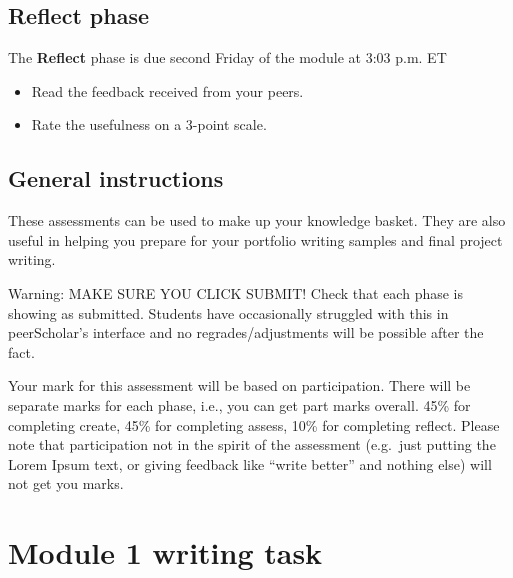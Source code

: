 \documentclass[
  openany]{book}
\begin{document}
\hypertarget{reflect-phase}{%
\subsection{Reflect phase}\label{reflect-phase}}

The \textbf{Reflect} phase is due second Friday of the module at 3:03 p.m. ET

\begin{itemize}
\item
  Read the feedback received from your peers.
\item
  Rate the usefulness on a 3-point scale.
\end{itemize}

\hypertarget{general-instructions}{%
\subsection{General instructions}\label{general-instructions}}

These assessments can be used to make up your knowledge basket. They are also useful in helping you prepare for your portfolio writing samples and final project writing.

Warning: MAKE SURE YOU CLICK SUBMIT! Check that each phase is showing as submitted. Students have occasionally struggled with this in peerScholar's interface and no regrades/adjustments will be possible after the fact.

Your mark for this assessment will be based on participation. There will be separate marks for each phase, i.e., you can get part marks overall. 45\% for completing create, 45\% for completing assess, 10\% for completing reflect. Please note that participation not in the spirit of the assessment (e.g.~just putting the Lorem Ipsum text, or giving feedback like ``write better'' and nothing else) will not get you marks.

\hypertarget{module-1-writing-task}{%
\section{Module 1 writing task}\label{module-1-writing-task}}
\end{document}
